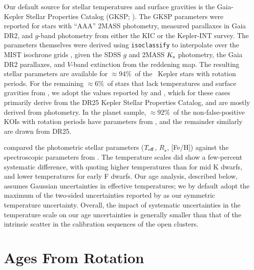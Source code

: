\documentclass[11pt,twocolumn,tighten]{aastex63}
\newcommand{\fracstarswithprotwithbtwenty}{{$\approx$94\%}}
\newcommand{\fracstarswithprotwithoutbtwenty}{{$\approx$6\%}}
\newcommand{\frackoisnofpwithprotwithbtwenty}{{$\approx$92\%}}
\begin{document}
Our default source for stellar temperatures and surface gravities is
the Gaia-Kepler Stellar Properties Catalog (GKSP;
\citealt{Berger_2020a_catalog}).  The GKSP parameters were reported
for stars with ``AAA'' 2MASS photometry, measured parallaxes in Gaia
DR2,  and $g$-band photometry from either the KIC or the Kepler-INT
survey.  The parameters themselves were derived using
\texttt{isoclassify} \citep{2017ApJ...844..102H} to interpolate over
the MIST isochrone grids \citep{Choi_2016,2016ApJS..222....8D}, given
the SDSS $g$ and 2MASS $K_{\rm s}$ photometry, the Gaia DR2
parallaxes, and $V$-band extinction from the
\citet{2018MNRAS.478..651G} reddening map.  The resulting stellar
parameters are available for \fracstarswithprotwithbtwenty\ of the
\nuniqstarsantosrot\ Kepler stars with rotation periods.  For the
remaining \fracstarswithprotwithoutbtwenty\ of stars that lack
temperatures and surface gravities from
, we adopt the values reported by
\citet{Santos_2019} and \citet{Santos_2021}, which for these cases
primarily derive from the \citet{Mathur_2017} DR25 Kepler Stellar
Properties Catalog, and are mostly derived from photometry.  In the
planet sample, \frackoisnofpwithprotwithbtwenty\ of the
non-false-positive KOIs with rotation periods have parameters from
\citet{Berger_2020a_catalog}, and the remainder similarly are drawn
from DR25. 

\citet{David_2021} compared the photometric
 stellar parameters ($T_{\rm eff}$,
$R_\star$, [Fe/H]) against the spectroscopic parameters from
\citet{Fulton_2018}.  The temperature scales did show a few-percent
systematic difference, with  quoting higher
temperatures than  for mid K dwarfs,
and lower temperatures for early F dwarfs.  Our age analysis,
described below, assumes Gaussian uncertainties in effective
temperatures; we by default adopt the maximum of the two-sided
uncertainties reported by  as our
symmetric temperature uncertainty.  Overall, the impact of systematic
uncertainties in the temperature scale on our age uncertainties is
generally smaller than that of the intrinsic scatter in the
calibration sequences of the open clusters.


\section{Ages From Rotation}
\label{sec:rotage}
\end{document}

